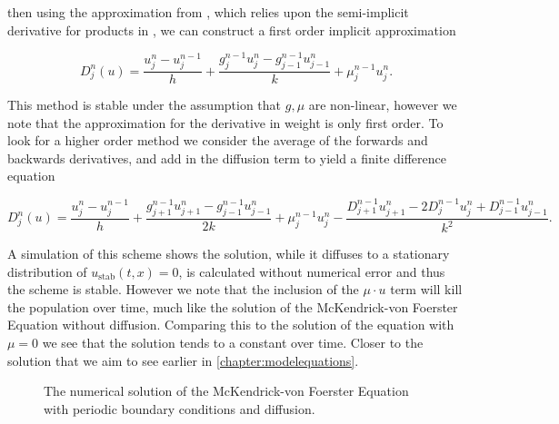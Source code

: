 \documentclass[../main.tex]{subfiles}
\begin{document}
  then using the approximation from \cite{hartvig2011}, which relies upon the semi-implicit derivative for products in \cite{press1992}, we can construct a first order implicit approximation

  \begin{equation}
    D^n_j(u) = \frac{u^n_j - u^{n-1}_j}{h} + \frac{g^{n-1}_j u^n_j - g^{n-1}_{j-1} u^n_{j-1}}{k} + \mu^{n-1}_j u^n_j.
  \end{equation}

  This method is stable under the assumption that $g, \mu$ are non-linear, however we note that the approximation for the derivative in weight is only first order. To look for a higher order method we consider the average of the forwards and backwards derivatives, and add in the diffusion term to yield a finite difference equation

  \begin{equation}\label{method:eq:fullimplicit}
    D^n_j(u) = \frac{u^n_j - u^{n-1}_j}{h} + \frac{g^{n-1}_{j+1} u^n_{j+1} - g^{n-1}_{j-1} u^n_{j-1}}{2k} + \mu^{n-1}_j u^n_j - \frac{D^{n-1}_{j+1} u^n_{j+1} - 2 D^{n-1}_j u^n_j + D^{n-1}_{j-1} u^n_{j-1}}{k^2}.
  \end{equation}

  A simulation of this scheme shows the solution, while it diffuses to a stationary distribution of $u_{\mathrm{stab}}(t, x) = 0$, is calculated without numerical error and thus the scheme is stable. However we note that the inclusion of the $\mu \cdot u$ term will kill the population over time, much like the solution of the McKendrick-von Foerster Equation without diffusion. Comparing this to the solution of the equation with $\mu = 0$ we see that the solution tends to a constant over time. Closer to the solution that we aim to see earlier in \autoref{chapter:modelequations}.

  \begin{figure}[htb]
    \centering
    \caption{\label{method:fig:diffusionSolution} The numerical solution of the McKendrick-von Foerster Equation with periodic boundary conditions and diffusion.}
  \end{figure}
\end{document}
